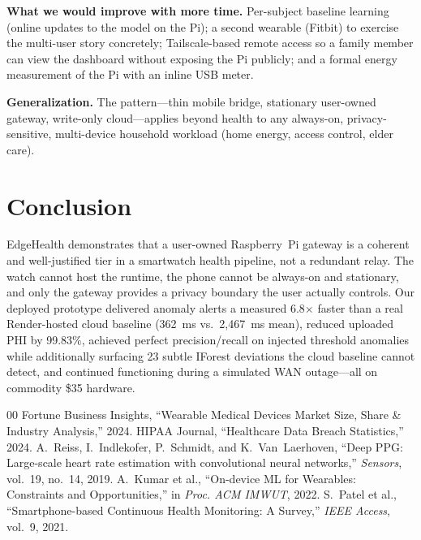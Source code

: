 \documentclass[conference]{IEEEtran}
\begin{document}
\textbf{What we would improve with more time.} Per-subject baseline learning (online updates to the model on the Pi); a second wearable (Fitbit) to exercise the multi-user story concretely; Tailscale-based remote access so a family member can view the dashboard without exposing the Pi publicly; and a formal energy measurement of the Pi with an inline USB meter.

\textbf{Generalization.} The pattern---thin mobile bridge, stationary user-owned gateway, write-only cloud---applies beyond health to any always-on, privacy-sensitive, multi-device household workload (home energy, access control, elder care).

\section{Conclusion}

EdgeHealth demonstrates that a user-owned Raspberry~Pi gateway is a coherent and well-justified tier in a smartwatch health pipeline, not a redundant relay. The watch cannot host the runtime, the phone cannot be always-on and stationary, and only the gateway provides a privacy boundary the user actually controls. Our deployed prototype delivered anomaly alerts a measured 6.8$\times$ faster than a real Render-hosted cloud baseline (362~ms vs.\ 2{,}467~ms mean), reduced uploaded PHI by 99.83\%, achieved perfect precision/recall on injected threshold anomalies while additionally surfacing 23 subtle IForest deviations the cloud baseline cannot detect, and continued functioning during a simulated WAN outage---all on commodity \$35 hardware.

\begin{thebibliography}{00}
 Fortune Business Insights, ``Wearable Medical Devices Market Size, Share \& Industry Analysis,'' 2024.
 HIPAA Journal, ``Healthcare Data Breach Statistics,'' 2024.
 A.~Reiss, I.~Indlekofer, P.~Schmidt, and K.~Van~Laerhoven, ``Deep PPG: Large-scale heart rate estimation with convolutional neural networks,'' \textit{Sensors}, vol.~19, no.~14, 2019.
 A.~Kumar et al., ``On-device ML for Wearables: Constraints and Opportunities,'' in \textit{Proc. ACM IMWUT}, 2022.
 S.~Patel et al., ``Smartphone-based Continuous Health Monitoring: A Survey,'' \textit{IEEE Access}, vol.~9, 2021.
\end{thebibliography}
\end{document}
